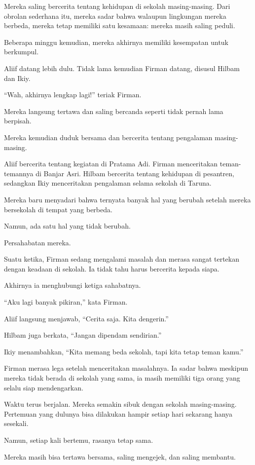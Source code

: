 Mereka saling bercerita tentang kehidupan di sekolah masing-masing. Dari obrolan sederhana itu, mereka sadar bahwa walaupun lingkungan mereka berbeda, mereka tetap memiliki satu kesamaan: mereka masih saling peduli.

Beberapa minggu kemudian, mereka akhirnya memiliki kesempatan untuk berkumpul.

Aliif datang lebih dulu. Tidak lama kemudian Firman datang, disusul Hilbam dan Ikiy.

``Wah, akhirnya lengkap lagi!'' teriak Firman.

Mereka langsung tertawa dan saling bercanda seperti tidak pernah lama berpisah.

Mereka kemudian duduk bersama dan bercerita tentang pengalaman masing-masing.

Aliif bercerita tentang kegiatan di Pratama Adi. Firman menceritakan teman-temannya di Banjar Asri. Hilbam bercerita tentang kehidupan di pesantren, sedangkan Ikiy menceritakan pengalaman selama sekolah di Taruna.

Mereka baru menyadari bahwa ternyata banyak hal yang berubah setelah mereka bersekolah di tempat yang berbeda.

Namun, ada satu hal yang tidak berubah.

Persahabatan mereka.

Suatu ketika, Firman sedang mengalami masalah dan merasa sangat tertekan dengan keadaan di sekolah. Ia tidak tahu harus bercerita kepada siapa.

Akhirnya ia menghubungi ketiga sahabatnya.

``Aku lagi banyak pikiran,'' kata Firman.

Aliif langsung menjawab, ``Cerita saja. Kita dengerin.''

Hilbam juga berkata, ``Jangan dipendam sendirian.''

Ikiy menambahkan, ``Kita memang beda sekolah, tapi kita tetap teman kamu.''

Firman merasa lega setelah menceritakan masalahnya. Ia sadar bahwa meskipun mereka tidak berada di sekolah yang sama, ia masih memiliki tiga orang yang selalu siap mendengarkan.

Waktu terus berjalan. Mereka semakin sibuk dengan sekolah masing-masing. Pertemuan yang dulunya bisa dilakukan hampir setiap hari sekarang hanya sesekali.

Namun, setiap kali bertemu, rasanya tetap sama.

Mereka masih bisa tertawa bersama, saling mengejek, dan saling membantu.

